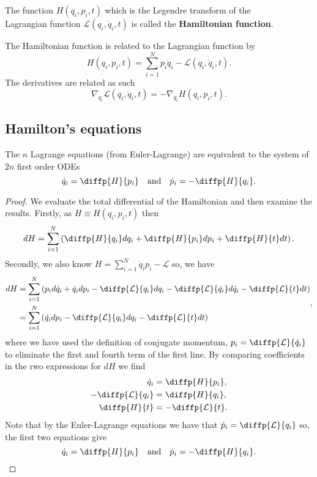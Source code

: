 \documentclass[12pt, a4paper]{article}
\begin{document}
\begin{definition}
    The function \(H(q_i,p_i,t)\) which is the Legendre transform of the \\ Lagrangian function \(\mathcal{L}(q_i,\dot{q}_i,t)\) is called the \textbf{Hamiltonian function}.
\end{definition}

\begin{mdthm}
    The Hamiltonian function is related to the Lagrangian function by 
    \[H(q_i,p_i,t) = \sum_{i=1}^{N} p_i \dot{q}_i - \mathcal{L}(q_i,\dot{q}_i,t).\]
    The derivatives are related as such 
    \[\nabla_{q_i} \mathcal{L}(q_i,\dot{q}_i,t) = - \nabla_{q_i} H(q_i, p_i,t).\]
\end{mdthm}

\subsection{Hamilton's equations}

\begin{mdthm}
    The \(n\) Lagrange equations (from Euler-Lagrange) are equivalent to the system of \(2n\) first order ODEs
    \[\dot{q}_i = \diffp{H}{{p_i}} \quad \text{and} \quad \dot{p}_i = - \diffp{H}{{q_i}}.\]
\end{mdthm}

\begin{proof}
    We evaluate the total differential of the Hamiltonian and then examine the results. Firstly, as \(H \equiv H(q_i,p_i,t)\) then 
    \[dH = \sum_{i=1}^{N} \left( \diffp{H}{{q_i}} d{q_i} + \diffp{H}{{p_i}} d{p_i} +\diffp{H}{t} dt \right).\]
    Secondly, we also know \(H = \sum_{i=1}^{N} \dot{q}_i p_i- \mathcal{L}\) so, we have 
    \[\begin{aligned}
        dH &= \sum_{i=1}^{N} \left( p_i d\dot{q}_i +\dot{q}_i d{p_i} - \diffp{\mathcal{L}}{{q_i}} d{q_i} - \diffp{\mathcal{L}}{{\dot{q}_i}} d \dot{q}_i - \diffp{\mathcal{L}}{t} dt\right) \\
        &= \sum_{i=1}^{N} \left( \dot{q}_i d{p_i}- \diffp{\mathcal{L}}{{q_i}} d{q_i} - \diffp{\mathcal{L}}{t} d{t} \right)
    \end{aligned},\]
    where we have used the definition of conjugate momentum, \(p_i = \diffp{\mathcal{L}}{{\dot{q}_i}}\) to eliminate the first and fourth term of the first line. By comparing coefficients in the rwo expressions for \(dH\) we find 
    \[\begin{aligned}
        \dot{q}_i &= \diffp{H}{{p_i}}, \\
        -\diffp{\mathcal{L}}{{q_i}} &= \diffp{H}{{q_i}}, \\
        \diffp{H}{t} &= - \diffp{\mathcal{L}}{t}.
    \end{aligned}\]
    Note that by the Euler-Lagrange equations we have that \(\dot{p}_i = \diffp{\mathcal{L}}{{q_i}}\) so, the first two equations give 
    \[\dot{q}_i = \diffp{H}{{p_i}} \quad \text{and} \quad \dot{p}_i = - \diffp{H}{{q_i}}.\]
\end{proof}
\end{document}
